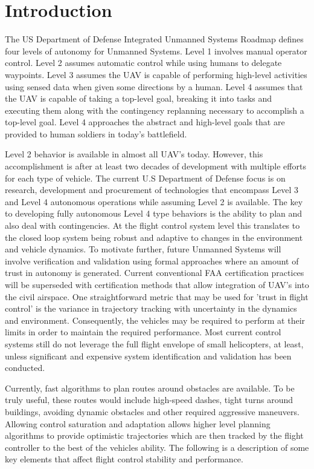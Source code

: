 
\section{Introduction}
The US Department of Defense Integrated Unmanned Systems Roadmap \cite{dod:uavroadmap:2011} defines four levels of autonomy for Unmanned Systems. Level 1 involves manual operator control. Level 2 assumes automatic control while using humans to delegate waypoints. Level 3 assumes the UAV is capable of performing high-level activities using sensed data when given some directions by a human. Level 4 assumes that the UAV is capable of taking a top-level goal, breaking it into tasks and executing them along with the contingency replanning necessary to accomplish a top-level goal. Level 4 approaches the abstract and high-level goals that are provided to human soldiers in today's battlefield.

Level 2 behavior is available in almost all UAV's today. However, this accomplishment is after at least two decades of development with multiple efforts for each type of vehicle. The current U.S Department of Defense focus is on research, development and procurement of technologies that encompass Level 3 and Level 4 autonomous operations while assuming Level 2 is available. The key to developing fully autonomous Level 4 type behaviors is the ability to plan and also deal with contingencies. At the flight control system level this translates to the closed loop system being robust and adaptive to changes in the environment and vehicle dynamics. To motivate further, future Unmanned Systems will involve verification and validation using formal approaches where an amount of trust in autonomy is generated. Current conventional FAA certification practices will be superseded with certification methods that allow integration of UAV's into the civil airspace. One straightforward metric that may be used for 'trust in flight control' is the variance in trajectory tracking with uncertainty in the dynamics and environment. Consequently, the vehicles may be required to perform at their limits in order to maintain the required performance. Most current control systems still do not leverage the full flight envelope of small helicopters, at least, unless significant and expensive system identification and validation has been conducted.

Currently, fast algorithms to plan routes around obstacles are available\cite{Frazzoli.Dahleh.ea:JGCD02,Karaman.Frazzoli:IJRR11}. To be truly useful, these routes would include high-speed dashes, tight turns around buildings, avoiding dynamic obstacles and other required aggressive maneuvers. Allowing control saturation and adaptation allows higher level planning algorithms to provide optimistic trajectories which are then tracked by the flight controller to the best of the vehicles ability. The following is a description of some key elements that affect flight control stability and performance.

